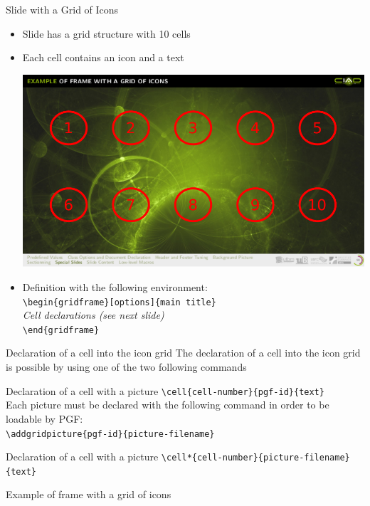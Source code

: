 \documentclass[english,sectioncirclenumberstyle]{ciadbeamer}
\begin{document}
\begin{frame}[t]{Slide with a Grid of Icons}
	\begin{itemize}
		\item Slide has a grid structure with 10 cells
		\item Each cell contains an icon and a text
			\begin{center}
				\includegraphics[width=.5\linewidth]{gridframe}
			\end{center}
		\item Definition with the following environment: \\
			\texttt{{\textbackslash}begin\{gridframe\}[options]\{main title\}} \\
			\emph{Cell declarations (see next slide)} \\
			\texttt{{\textbackslash}end\{gridframe\}}
	\end{itemize}
\end{frame}

\begin{frame}{{Declaration of a cell} into the icon grid}
	The declaration of a cell into the icon grid is possible by using one of the two following commands
	\begin{block}{Declaration of a cell with a picture }
		\texttt{{\textbackslash}cell\{cell-number\}\{pgf-id\}\{text\}} \\[.25cm]
		Each picture must be declared with the following command in order to be loadable by PGF: \\
			\texttt{{\textbackslash}addgridpicture\{pgf-id\}\{picture-filename\}}
	\end{block}
	\begin{block}{Declaration of a cell with a picture }
		\texttt{{\textbackslash}cell*\{cell-number\}\{picture-filename\}\{text\}}
	\end{block}
\end{frame}

\begin{gridframe}{{Example of frame} with a grid of icons}
\end{gridframe}
\end{document}
